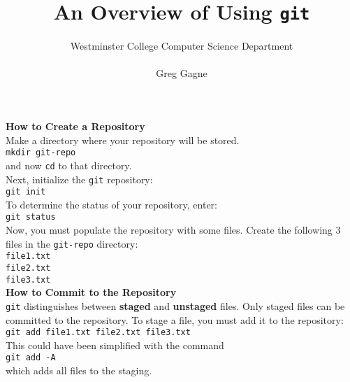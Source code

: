 \documentclass[12pt]{article}
\title{An Overview of Using {\tt git}}
\author{Westminster College Computer Science Department \\ \\ Greg Gagne}
\begin{document}
\maketitle

\newpage

\noindent
{\bf How to Create a Repository} \\

\noindent
Make a directory where your repository will be stored. \\

{\tt mkdir git-repo} \\

\noindent
and now {\tt cd} to that directory. \\ 

\noindent
Next, initialize the {\tt git} repository: \\

{\tt git init} \\

\noindent
To determine the status of your repository, enter: \\

{\tt git status} \\

\noindent
Now, you must populate the repository with some files. Create the following 3 files in the {\tt git-repo} directory: \\

{\tt file1.txt} \\ 

{\tt file2.txt} \\ 

{\tt file3.txt} \\ 

\noindent
{\bf How to Commit to the Repository} \\

\noindent
{\tt git} distinguishes between {\bf staged} and {\bf unstaged} files. Only staged files can be committed to the repository. To stage a file, you must add it to the repository: \\

{\tt git add file1.txt file2.txt file3.txt} \\

\noindent
This could have been simplified with the command \\

{\tt git add -A} \\

\noindent
which adds all files to the staging. \\
\end{document}
